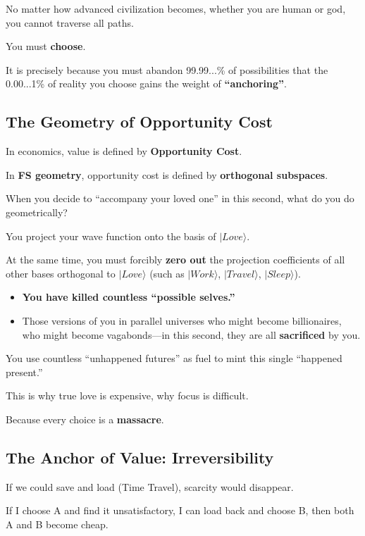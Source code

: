 No matter how advanced civilization becomes, whether you are human or god, you cannot traverse all paths.

You must \textbf{choose}.

It is precisely because you must abandon 99.99...\% of possibilities that the 0.00...1\% of reality you choose gains the weight of \textbf{``anchoring''}.

\subsection{The Geometry of Opportunity Cost}

In economics, value is defined by \textbf{Opportunity Cost}.

In \textbf{FS geometry}, opportunity cost is defined by \textbf{orthogonal subspaces}.

When you decide to ``accompany your loved one'' in this second, what do you do geometrically?

You project your wave function onto the basis of $|Love\rangle$.

At the same time, you must forcibly \textbf{zero out} the projection coefficients of all other bases orthogonal to $|Love\rangle$ (such as $|Work\rangle$, $|Travel\rangle$, $|Sleep\rangle$).

\begin{itemize}
\item \textbf{You have killed countless ``possible selves.''}

\item Those versions of you in parallel universes who might become billionaires, who might become vagabonds---in this second, they are all \textbf{sacrificed} by you.
\end{itemize}

You use countless ``unhappened futures'' as fuel to mint this single ``happened present.''

This is why true love is expensive, why focus is difficult.

Because every choice is a \textbf{massacre}.

\subsection{The Anchor of Value: Irreversibility}

If we could save and load (Time Travel), scarcity would disappear.

If I choose A and find it unsatisfactory, I can load back and choose B, then both A and B become cheap.

